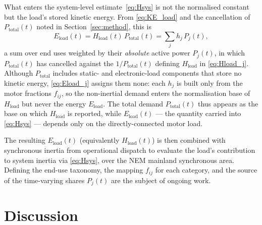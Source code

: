\documentclass[journal]{IEEEtran}
\begin{document}
What enters the system-level estimate~\eqref{eq:Hsys} is not the normalised
constant but the load's stored kinetic energy. From \eqref{eq:KE_load} and the
cancellation of $P_{\mathrm{total}}(t)$ noted in Section~\ref{sec:method}, this is
\begin{equation}
  E_{\mathrm{load}}(t) = H_{\mathrm{load}}(t)\,P_{\mathrm{total}}(t)
   = \sum_{j} h_j\,P_j(t),
  \label{eq:Eload_j}
\end{equation}
a sum over end uses weighted by their \emph{absolute} active power $P_j(t)$, in
which $P_{\mathrm{total}}(t)$ has cancelled against the $1/P_{\mathrm{total}}(t)$
defining $H_{\mathrm{load}}$ in \eqref{eq:Hload_j}. Although $P_{\mathrm{total}}$
includes static- and electronic-load components that store no kinetic energy,
\eqref{eq:Eload_j} assigns them none: each $h_j$ is built only from the motor
fractions $f_{ij}$, so the non-inertial demand enters the normalisation base of
$H_{\mathrm{load}}$ but never the energy $E_{\mathrm{load}}$. The total demand
$P_{\mathrm{total}}(t)$ thus appears as the base on which $H_{\mathrm{load}}$ is
reported, while $E_{\mathrm{load}}(t)$ --- the quantity carried into
\eqref{eq:Hsys} --- depends only on the directly-connected motor load.

The resulting $E_{\mathrm{load}}(t)$ (equivalently $H_{\mathrm{load}}(t)$) is then
combined with synchronous inertia from operational dispatch to evaluate the load's
contribution to system inertia via \eqref{eq:Hsys}, over the NEM mainland
synchronous area. Defining the end-use
taxonomy, the mapping $f_{ij}$ for each category, and the source of the
time-varying shares $P_j(t)$ are the subject of ongoing work.


\section{Discussion}
\label{sec:discussion}

\end{document}
